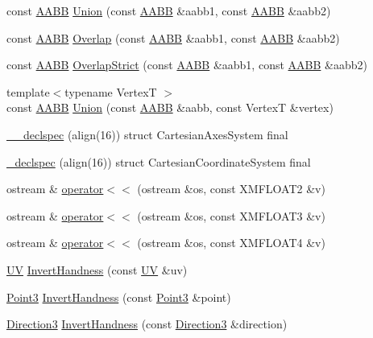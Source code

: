 \begin{DoxyCompactItemize}
\item 
const \hyperlink{structmage_1_1_a_a_b_b}{A\+A\+BB} \hyperlink{namespacemage_a14f2c20e37511b983bcb731afbb6b0b6}{Union} (const \hyperlink{structmage_1_1_a_a_b_b}{A\+A\+BB} \&aabb1, const \hyperlink{structmage_1_1_a_a_b_b}{A\+A\+BB} \&aabb2)
\item 
const \hyperlink{structmage_1_1_a_a_b_b}{A\+A\+BB} \hyperlink{namespacemage_ade79a277862009e505ce6c15ecd98cdf}{Overlap} (const \hyperlink{structmage_1_1_a_a_b_b}{A\+A\+BB} \&aabb1, const \hyperlink{structmage_1_1_a_a_b_b}{A\+A\+BB} \&aabb2)
\item 
const \hyperlink{structmage_1_1_a_a_b_b}{A\+A\+BB} \hyperlink{namespacemage_a31fba0978e5da37928e5eec83a4f784d}{Overlap\+Strict} (const \hyperlink{structmage_1_1_a_a_b_b}{A\+A\+BB} \&aabb1, const \hyperlink{structmage_1_1_a_a_b_b}{A\+A\+BB} \&aabb2)
\item 
{\footnotesize template$<$typename VertexT $>$ }\\const \hyperlink{structmage_1_1_a_a_b_b}{A\+A\+BB} \hyperlink{namespacemage_aa727c025f86c9da2b6704c5f40b3d700}{Union} (const \hyperlink{structmage_1_1_a_a_b_b}{A\+A\+BB} \&aabb, const VertexT \&vertex)
\item 
\hyperlink{namespacemage_a34d95119b99d5281d078459091da1c99}{\+\_\+\+\_\+declspec} (align(16)) struct Cartesian\+Axes\+System final
\item 
\hyperlink{namespacemage_ae12ad80c2a6510257f38661c90c19b19}{\+\_\+declspec} (align(16)) struct Cartesian\+Coordinate\+System final
\item 
ostream \& \hyperlink{namespacemage_ac348ad49bf7e9912aa70cda1b0ca553d}{operator$<$$<$} (ostream \&os, const X\+M\+F\+L\+O\+A\+T2 \&v)
\item 
ostream \& \hyperlink{namespacemage_a44b2d3046802608544402245919f219b}{operator$<$$<$} (ostream \&os, const X\+M\+F\+L\+O\+A\+T3 \&v)
\item 
ostream \& \hyperlink{namespacemage_af6c1d1c5718d611450932bde30d2bfef}{operator$<$$<$} (ostream \&os, const X\+M\+F\+L\+O\+A\+T4 \&v)
\item 
\hyperlink{structmage_1_1_u_v}{UV} \hyperlink{namespacemage_a13b912f3dcd9c202fe3f9edb424e3b78}{Invert\+Handness} (const \hyperlink{structmage_1_1_u_v}{UV} \&uv)
\item 
\hyperlink{structmage_1_1_point3}{Point3} \hyperlink{namespacemage_a20ded71f51e2014bab8e7d232eaf1c29}{Invert\+Handness} (const \hyperlink{structmage_1_1_point3}{Point3} \&point)
\item 
\hyperlink{structmage_1_1_direction3}{Direction3} \hyperlink{namespacemage_a1d236e395736f7b5e28e52ccd3d643ae}{Invert\+Handness} (const \hyperlink{structmage_1_1_direction3}{Direction3} \&direction)

\end{DoxyCompactItemize}
